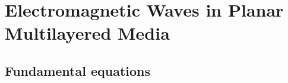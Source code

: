 


















\section{Electromagnetic Waves in Planar Multilayered Media}

\subsection{Fundamental equations}
\label{subsec:em_fundamental_equations}

